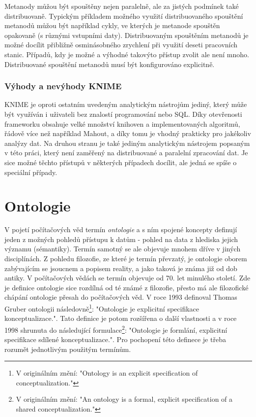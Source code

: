 \documentclass[11pt,twoside,a4paper]{book}
\begin{document}
			Metanody můžou být spouštěny nejen paralelně, ale za jistých podmínek také distribuovaně. Typickým příkladem možného využití distribuovaného spouštění metanodů můžou být například cykly, ve kterých je metanode spouštěn opakovaně (s různými vstupními daty). Distribuovaným spouštěním metanodů je možné docílit přibližně osminásobného zrychlení při využití deseti pracovních stanic. Případů, kdy je možné a výhodné takovýto přístup zvolit ale není mnoho. Distribuované spouštění metanodů musí být konfigurováno explicitně.\cite{knimeb02}

			\subsubsection{Výhody a nevýhody KNIME}
				KNIME je oproti ostatním uvedeným analytickým nástrojům jediný, který může být využíván i uživateli bez znalostí programování nebo SQL. Díky otevřenosti frameworku obsahuje velké množství knihoven a implementovaných algoritmů, řádově více než například Mahout, a díky tomu je vhodný prakticky pro jakékoliv analýzy dat. Na druhou stranu je také jediným analytickým nástrojem popsaným v této práci, který není zaměřený na distribuované a paralelní zpracování dat. Je sice možné těchto přístupů v některých případech docílit, ale jedná se spíše o speciální případy. 


	\section{Ontologie}\label{sec:ontologie}
		V pojetí počítačových věd termín \textit{ontologie} a s ním spojené koncepty definují jeden z možných pohledů přístupu k datům - pohled na data z hlediska jejich významu (sémantiky). Termín samotný se ale objevuje mnohem dříve v jiných disciplínách. Z pohledu filozofie, ze které je termín převzatý, je ontologie oborem zabývajícím se jsoucnem a popisem reality, a jako taková je známa již od dob antiky. V počítačových vědách se termín objevuje od 70. let minulého století. Zde je definice ontologie sice rozdílná od té známé z filozofie, přesto má ale filozofické chápání ontologie přesah do počítačových věd. V roce 1993 definoval Thomas Gruber ontologii následovně\footnote{V originálním znění: "Ontology is an explicit specification of conceptualization."}: "Ontologie je explicitní specifikace konceptualizace.".\cite{ontologie01} Tato definice je potom rozšířena o další vlastnosti\cite{ontologieb02} a v roce 1998 shrunuta do následující formulace\footnote{V originálním znění: "An ontology is a formal, explicit specification of a shared conceptualization."}: "Ontologie je formlání, explicitní specifikace sdílené konceptualizace.".\cite{ontologiec03} Pro pochopení této definece je třeba rozumět jednotlivým použitým termínům.
\end{document}
